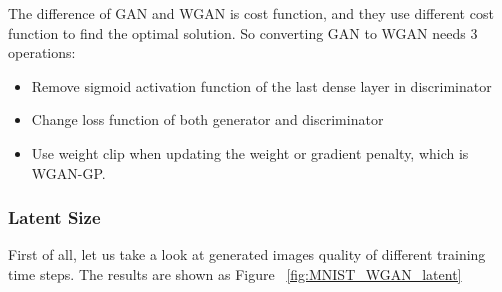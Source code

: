 \documentclass[12pt,letterpaper]{article}
\begin{document}
The difference of GAN and WGAN is cost function, and they use different cost function to find the optimal solution. So converting GAN to WGAN needs $3$ operations:
\begin{itemize}
    \item Remove sigmoid activation function of the last dense layer in discriminator
    \item Change loss function of both generator and discriminator
    \item Use weight clip when updating the weight or gradient penalty, which is WGAN-GP.
\end{itemize}

\subsubsection{Latent Size}

First of all, let us take a look at generated images quality of different training time steps. The results are shown as Figure ~\ref{fig:MNIST_WGAN_latent}
\end{document}
